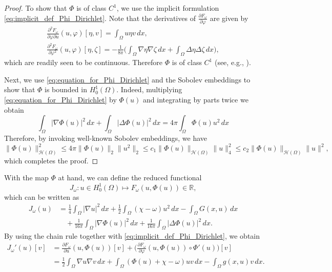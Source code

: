 \documentclass[10pt,a4paper]{amsart}
\numberwithin{equation}{section}
\begin{document}
\begin{proof}
To show that $\Phi$ is of class $C^1$, we use the implicit formulation 
\eqref{eq:implicit_def_Phi_Dirichlet}. Note that the derivatives of 
$\frac{\partial F_\omega}{\partial \varphi}$ are given by
\begin{equation}
\begin{gathered}
  \frac{\partial^2 F_\omega}{\partial \varphi \partial u} (u, \varphi)[\eta, v]
  = \int_\Omega u \eta v \,dx,  \\
  \frac{\partial^2 F_\omega}{\partial \varphi^2} (u, \varphi) [\eta, \zeta]
   = - \frac{1}{8\pi} \Big(\int_\Omega \nabla \eta \nabla \zeta \,dx
   + \int_\Omega \Delta \eta \Delta \zeta \,dx \Big),
\end{gathered}
\end{equation}
which are readily seen to be continuous. Therefore $\Phi$ is of class $C^1$
(see, e.g., \cite{AmbrosettiProdi1993}).

Next, we  use \eqref{eq:equation_for_Phi_Dirichlet} and the Sobolev embeddings to 
show that $\Phi$ is bounded in $H_0^1(\Omega)$. Indeed, multiplying 
\eqref{eq:equation_for_Phi_Dirichlet} by $\Phi(u)$ and integrating by parts twice we 
obtain
\[
 \int_\Omega |\nabla \Phi(u)|^2 \,dx + \int_\Omega |\Delta \Phi(u)|^2 \,dx = 4 \pi \int_\Omega \Phi(u) u^2 \,dx
\]
Therefore, by invoking well-known Sobolev embeddings, we have
\[
 \|\Phi(u)\|_{\mathcal{H}(\Omega)}^2
  \leq 4 \pi \|\Phi(u)\|_2 \|u^2\|_2  
  \leq c_1 \|\Phi(u)\|_{\mathcal{H}(\Omega)} \|u\|_4^2
  \leq c_2 \|\Phi(u)\|_{\mathcal{H}(\Omega)} \|u\|^2,
\]
 which completes the proof.
\end{proof}

With the map $\Phi$ at hand, we can define the  reduced functional
\[
 J_\omega : u \in H_0^1(\Omega) \mapsto F_\omega(u, \Phi(u)) \in \mathbb R,
\]
which can be written as
\begin{equation}
\begin{aligned}
 J_\omega(u)
 & = \frac{1}{4} \int_\Omega |\nabla u|^2 \,dx
  + \frac{1}{2} \int_\Omega (\chi - \omega) u^2 \,dx
  - \int_\Omega G(x, u) \,dx  \\
 & \quad + \frac{1}{16 \pi} \int_\Omega |\nabla \Phi(u)|^2 \,dx
 + \frac{1}{16 \pi} \int_\Omega |\Delta \Phi(u)|^2 \,dx.
\end{aligned}\label{eq:def_J}
\end{equation}
By using the chain rule together with \eqref{eq:implicit_def_Phi_Dirichlet}, we obtain
\begin{equation}
\begin{aligned}
 J_\omega'(u)[v]
 & = \frac{\partial F_\omega}{\partial u}(u, \Phi(u))[v]
  + \Big(\frac{\partial F_\omega}{\partial \varphi
 }(u, \Phi(u)) \circ \Phi'(u)\Big) [v]  \\
 & = \frac{1}{2} \int_\Omega \nabla u \nabla v \,dx + \int_\Omega (\Phi(u)
 + \chi - \omega) u v \,dx - \int_\Omega g(x, u) v \,dx.
\end{aligned} \label{eq:J_prime}
\end{equation}
\end{document}
